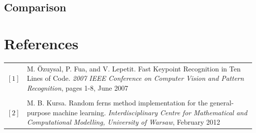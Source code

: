 \documentclass[twocolumn]{article}
\begin{document}

\subsection{Comparison}


\onecolumn
\section*{References}

\begin{tabular}{p{1cm}p{11cm}}

$[1]$ & M. \"Ozuysal, P. Fua, and V. Lepetit. Fast Keypoint Recognition in Ten Lines of Code. \textit{2007 IEEE Conference on Computer Vision and Pattern Recognition}, pages 1-8, June 2007\\
 & \\
$[2]$ & M. B. Kursa. Random ferns method implementation for the general-purpose machine learning. \textit{Interdisciplinary Centre for Mathematical and Computational Modelling, University of Warsaw}, February 2012

\end{tabular}
\end{document}
